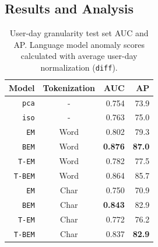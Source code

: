 \documentclass[letterpaper]{article} %
\begin{document}
\subsection{Results and Analysis}

\begin{table}
    \centering
    \begin{tabular}{|r|c|r|r|} \hline
        {\bf Model} & {\bf Tokenization}  & {\bf AUC} & {\bf AP} \\\hline
        \verb|pca|   & -          & 0.754 & 73.9 \\\hline
        \verb|iso|   & -          & 0.763 & 75.0 \\\hline\hline
        \verb|EM|    & Word       & 0.802 &79.3 \\\hline
        \verb|BEM|   & Word       & {\bf 0.876} & {\bf 87.0}\\\hline
        \verb|T-EM|  & Word       & 0.782 &  77.5 \\\hline
        \verb|T-BEM| & Word       & 0.864 &  85.7 \\\hline\hline
        \verb|EM|    & Char       & 0.750  & 70.9\\\hline
        \verb|BEM|   & Char       &{\bf 0.843}  & {82.9}\\\hline
        \verb|T-EM|  & Char       & 0.772 & 76.2\\\hline
        \verb|T-BEM| & Char       & { 0.837} & {\bf 82.9}\\\hline
    \end{tabular}
    \caption{User-day granularity test set AUC and AP. Language model anomaly scores calculated with average user-day normalization (\texttt{diff}).} \label{tab:aucap}
\end{table}
\end{document}
